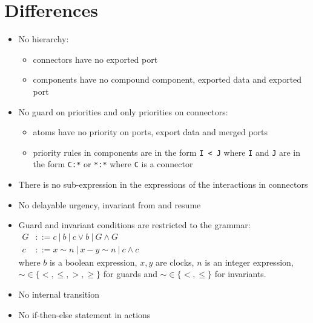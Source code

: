 \documentclass[a4paper]{article}
\begin{document}
\section*{Differences}
\begin{itemize}
  \item No hierarchy:
        \begin{itemize}
          \item connectors have no exported port
          \item components have no compound component, exported data and exported port
        \end{itemize}
  \item No guard on priorities and only priorities on connectors:
        \begin{itemize}
          \item atoms have no priority on ports, export data and merged ports
          \item priority rules in components are in the form \texttt{I < J} where \texttt{I} and \texttt{J} are in the
                form \texttt{C:*} or \texttt{*:*} where \texttt{C} is a connector
        \end{itemize}
  \item There is no sub-expression in the expressions of the interactions in connectors
  \item No delayable urgency, invariant from and resume
  \item Guard and invariant conditions are restricted to the grammar: \\
        $\begin{aligned}
            G & ::= c \:\vert\: b \:\vert\: c \vee b \:\vert\: G \wedge G \\
            c & ::= x \sim n \:\vert\: x - y \sim n \:\vert\: c\wedge c
          \end{aligned}$ \\
        where $b$ is a boolean expression, $x,y$ are clocks, $n$ is an integer expression,
        $\sim \in \{<, \leq, >, \geq \}$ for guards and $\sim \in \{<, \leq \}$ for invariants.
  \item No internal transition
  \item No if-then-else statement in actions
\end{itemize}
\end{document}
